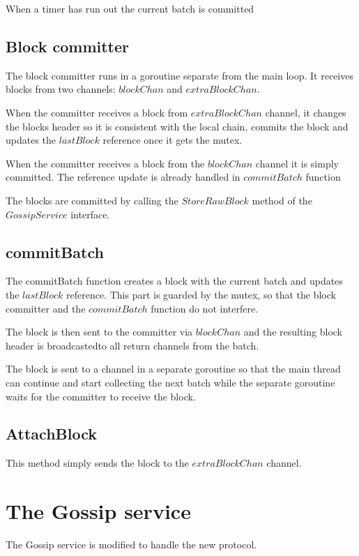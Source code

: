 When a timer has run out the current batch is committed

\subsection*{Block committer}

The block committer runs in a goroutine separate from the main loop. It receives blocks from two channels: $blockChan$ and $extraBlockChan$.

When the committer receives a block from $extraBlockChan$ channel, it changes the blocks header so it is consistent with the local chain, commits the block and updates the $lastBlock$ reference once it gets the mutex.

When the committer receives a block from the $blockChan$ channel it is simply committed. The reference update is already handled in $commitBatch$ function

The blocks are committed by calling the $StoreRawBlock$ method of the $GossipService$ interface.

\subsection*{commitBatch}

The commitBatch function creates a block with the current batch and updates the $lastBlock$ reference. This part is guarded by the mutex, so that the block committer and the $commitBatch$ function do not interfere.

The block is then sent to the committer via $blockChan$ and the resulting block header is broadcastedto all return channels from the batch.

The block is sent to a channel in a separate goroutine so that the main thread can continue and start collecting the next batch while the separate goroutine waits for the committer to receive the block.

\subsection*{AttachBlock}

This method simply sends the block to the $extraBlockChan$ channel.

\section{The Gossip service}

The Gossip service is modified to handle the new protocol.

